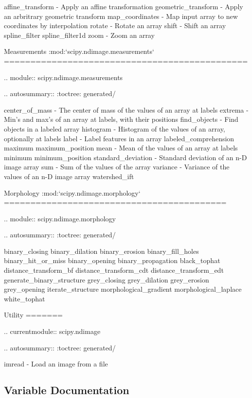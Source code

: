 \begin{DoxyVerb}
   affine_transform - Apply an affine transformation
   geometric_transform - Apply an arbritrary geometric transform
   map_coordinates - Map input array to new coordinates by interpolation
   rotate - Rotate an array
   shift - Shift an array
   spline_filter
   spline_filter1d
   zoom - Zoom an array

Measurements :mod:`scipy.ndimage.measurements`
==============================================

.. module:: scipy.ndimage.measurements

.. autosummary::
   :toctree: generated/

   center_of_mass - The center of mass of the values of an array at labels
   extrema - Min's and max's of an array at labels, with their positions
   find_objects - Find objects in a labeled array
   histogram - Histogram of the values of an array, optionally at labels
   label - Label features in an array
   labeled_comprehension
   maximum
   maximum_position
   mean - Mean of the values of an array at labels
   minimum
   minimum_position
   standard_deviation - Standard deviation of an n-D image array
   sum - Sum of the values of the array
   variance - Variance of the values of an n-D image array
   watershed_ift

Morphology :mod:`scipy.ndimage.morphology`
==========================================

.. module:: scipy.ndimage.morphology

.. autosummary::
   :toctree: generated/

   binary_closing
   binary_dilation
   binary_erosion
   binary_fill_holes
   binary_hit_or_miss
   binary_opening
   binary_propagation
   black_tophat
   distance_transform_bf
   distance_transform_cdt
   distance_transform_edt
   generate_binary_structure
   grey_closing
   grey_dilation
   grey_erosion
   grey_opening
   iterate_structure
   morphological_gradient
   morphological_laplace
   white_tophat

Utility
=======

.. currentmodule:: scipy.ndimage

.. autosummary::
   :toctree: generated/

   imread - Load an image from a file\end{DoxyVerb}
 

\subsection{Variable Documentation}
\hypertarget{namespacescipy_1_1ndimage_a3157393e70fe2b865c39df03f3abab9b}{}
